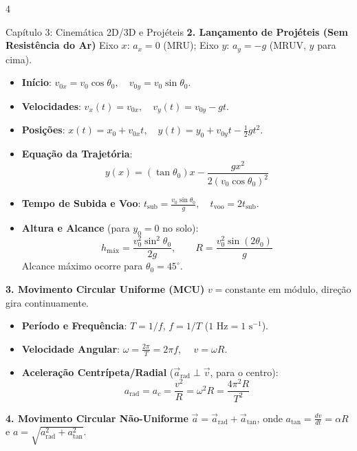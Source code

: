 \documentclass[9pt,a4paper,landscape]{extarticle}
\begin{document}
\begin{multicols*}{4}
\begin{topicbox}{Capítulo 3: Cinemática 2D/3D e Projéteis}
\textbf{2. Lançamento de Projéteis (Sem Resistência do Ar)}
Eixo $x$: $a_x = 0$ (MRU); Eixo $y$: $a_y = -g$ (MRUV, $y$ para cima).
\begin{itemize}
    \item \textbf{Início}: $v_{0x} = v_0\cos\theta_0, \quad v_{0y} = v_0\sin\theta_0$.
    \item \textbf{Velocidades}: $v_x(t) = v_{0x}, \quad v_y(t) = v_{0y} - gt$.
    \item \textbf{Posições}: $x(t) = x_0 + v_{0x} t, \quad y(t) = y_0 + v_{0y} t - \tfrac{1}{2} gt^2$.
    \item \textbf{Equação da Trajetória}:
    \begin{equation*}
        y(x) = (\tan\theta_0) x - \frac{g x^2}{2(v_0\cos\theta_0)^2}
    \end{equation*}
    \item \textbf{Tempo de Subida e Voo}: $t_{\text{sub}} = \frac{v_0\sin\theta_0}{g}, \quad t_{\text{voo}} = 2 t_{\text{sub}}$.
    \item \textbf{Altura e Alcance} (para $y_0 = 0$ no solo):
    \begin{equation*}
        h_{\text{máx}} = \frac{v_0^2\sin^2\theta_0}{2g}, \qquad R = \frac{v_0^2\sin(2\theta_0)}{g}
    \end{equation*}
    Alcance máximo ocorre para $\theta_0 = 45^\circ$.
\end{itemize}

\textbf{3. Movimento Circular Uniforme (MCU)}
$v = \text{constante}$ em módulo, direção gira continuamente.
\begin{itemize}
    \item \textbf{Período e Frequência}: $T = 1/f$, $f = 1/T$ ($1\text{ Hz} = 1\text{ s}^{-1}$).
    \item \textbf{Velocidade Angular}: $\omega = \frac{2\pi}{T} = 2\pi f$, $\quad v = \omega R$.
    \item \textbf{Aceleração Centrípeta/Radial} ($\vec{a}_{\text{rad}} \perp \vec{v}$, para o centro):
    \begin{equation*}
        a_{\text{rad}} = a_c = \frac{v^2}{R} = \omega^2 R = \frac{4\pi^2 R}{T^2}
    \end{equation*}
\end{itemize}

\textbf{4. Movimento Circular Não-Uniforme}
$\vec{a} = \vec{a}_{\text{rad}} + \vec{a}_{\text{tan}}$, onde $a_{\text{tan}} = \frac{dv}{dt} = \alpha R$ e $a = \sqrt{a_{\text{rad}}^2 + a_{\text{tan}}^2}$.


\end{topicbox}
\end{multicols*}
\end{document}
